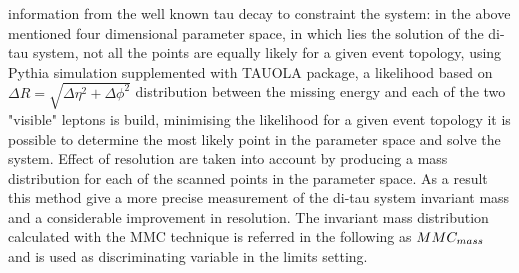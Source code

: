 information from the well known tau decay to constraint the system:
in the above mentioned four dimensional parameter space, in which lies the solution of the di-tau system, not all the points are 
equally likely for a given event topology, using Pythia simulation supplemented with TAUOLA package,
a likelihood based on $\Delta R  =  \sqrt{\Delta\eta^2 + \Delta\phi^2}$ distribution between the missing energy and each of the two "visible" leptons is build, 
minimising the likelihood for a given event topology it is possible to determine the most likely point in the parameter space
and solve the system. Effect of resolution are taken into account by producing a mass distribution
for each of the scanned points in the parameter space. As a result this method give a more precise measurement of the di-tau
system invariant mass and a considerable improvement in resolution. The invariant mass distribution 
calculated with the MMC technique is referred in the following as $MMC_{mass}$ and is used as discriminating 
variable in the limits setting.

 


